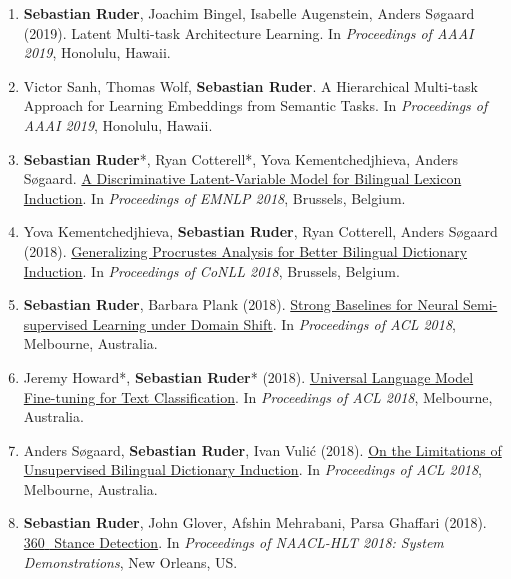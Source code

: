 \documentclass[10pt,letterpaper]{article}
\begin{document}
\begin{enumerate}
	\parskip=0.1em
	
	\item \textbf{Sebastian Ruder}, Joachim Bingel, Isabelle Augenstein, Anders Søgaard (2019). Latent Multi-task Architecture Learning. In \textit{Proceedings of AAAI 2019}, Honolulu, Hawaii.
	
	\item Victor Sanh, Thomas Wolf, \textbf{Sebastian Ruder}. A Hierarchical Multi-task Approach for Learning Embeddings from Semantic Tasks. In \textit{Proceedings of AAAI 2019}, Honolulu, Hawaii.
	
	\item \textbf{Sebastian Ruder}*, Ryan Cotterell*, Yova Kementchedjhieva, Anders Søgaard. \href{https://arxiv.org/abs/1808.09334}{A Discriminative Latent-Variable Model for Bilingual Lexicon Induction}. In \textit{Proceedings of EMNLP 2018}, Brussels, Belgium.

	\item Yova Kementchedjhieva, \textbf{Sebastian Ruder}, Ryan Cotterell, Anders Søgaard (2018). \href{https://arxiv.org/abs/1809.00064}{Generalizing Procrustes Analysis for Better Bilingual Dictionary Induction}. In \textit{Proceedings of CoNLL 2018}, Brussels, Belgium.
	
	\item \textbf{Sebastian Ruder}, Barbara Plank (2018). \href{https://arxiv.org/abs/1804.09530}{Strong Baselines for Neural Semi-supervised Learning under Domain Shift}. In \textit{Proceedings of ACL 2018}, Melbourne, Australia.

	\item Jeremy Howard*, \textbf{Sebastian Ruder}* (2018). \href{https://arxiv.org/abs/1801.06146}{Universal Language Model Fine-tuning for Text Classification}. In \textit{Proceedings of ACL 2018}, Melbourne, Australia.

	\item Anders Søgaard, \textbf{Sebastian Ruder}, Ivan Vulić (2018). \href{https://arxiv.org/abs/1805.03620}{On the Limitations of Unsupervised Bilingual Dictionary Induction}. In \textit{Proceedings of ACL 2018}, Melbourne, Australia.
	
	\item \textbf{Sebastian Ruder}, John Glover, Afshin Mehrabani, Parsa Ghaffari (2018). \href{https://arxiv.org/abs/1804.00982}{360\textdegree $\!$ $\!$ Stance Detection}. In \textit{Proceedings of NAACL-HLT 2018: System Demonstrations}, New Orleans, US. 


\end{enumerate}
\end{document}
